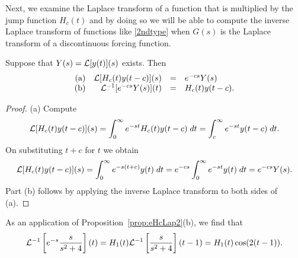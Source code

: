 \documentclass{ximera}
\begin{document}
Next, we examine the Laplace transform of a function that is multiplied 
by the jump function $H_c(t)$ and by doing so we will be able to compute the
inverse Laplace transform of functions like \eqref{2ndtype} when $G(s)$ is the 
Laplace transform of a discontinuous forcing function.

\begin{proposition}  \label{prop:eHcLap2}
Suppose that $Y(s)={\cal L}[y(t)](s)$ exists.  Then
\[
\begin{array}{rrcl}
\mbox{(a)} & {\cal L}[H_c(t)y(t-c)](s) & = & e^{-cs} Y(s) \\
\mbox{(b)} & {\cal L}^{-1}[e^{-cs}Y(s)](t) & = & H_c(t)y(t-c).
\end{array}
\]
\end{proposition}

\begin{proof} (a)  Compute
\[
{\cal L}[H_c(t)y(t-c)](s) = \int_0^{\infty} e^{-st}H_c(t) y(t-c)\; dt
= \int_c^{\infty} e^{-st}y(t-c)\; dt.
\]
On substituting $t+c$ for $t$ we obtain
\[
{\cal L}[H_c(t)y(t-c)](s)=\int_0^{\infty} e^{-s(t+c)}y(t)\; dt
=e^{-cs} \int_0^{\infty} e^{-st}y(t)\; dt
=e^{-cs} Y(s).
\]
Part (b) follows by applying the inverse Laplace transform to both sides 
of (a).  \end{proof}

As an application of Proposition~\ref{prop:eHcLap2}(b), we find that
\[
{\cal L}^{-1}\left[ e^{-s}\frac{s}{s^2+4}\right](t)=
H_1(t){\cal L}^{-1}\left[ \frac{s}{s^2+4}\right](t-1)=
H_1(t)\cos(2(t-1)).
\]

\EXER

\TEXER
\end{document}
